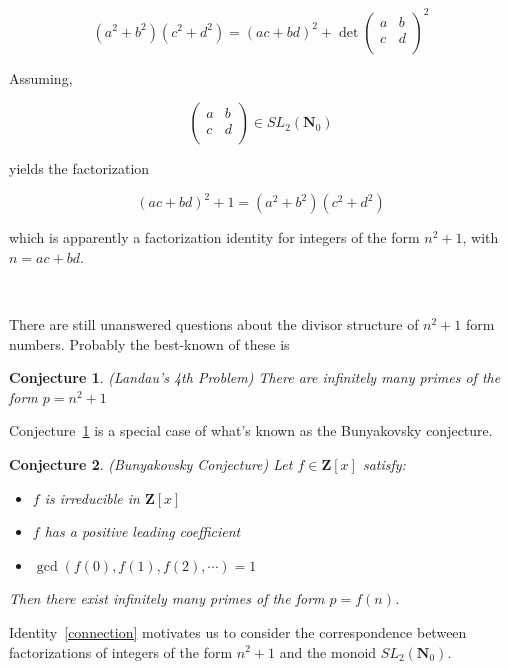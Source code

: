 \documentclass{article}
\newtheorem{conjecture}{Conjecture}
\begin{document}
$$(a^2 + b^2)(c^2 + d^2) = (ac+bd)^2 + \det \begin{pmatrix} a & b \\
c & d \\
\end{pmatrix}^2$$

Assuming, 

$$\begin{pmatrix} 
a & b \\
c & d \\
\end{pmatrix} \in SL_2(\mathbf{N}_0)$$

yields the factorization 

\begin{equation}\label{connection}
 (ac + bd)^2 + 1 = (a^2 + b^2)(c^2 + d^2)   
\end{equation}

which is apparently a factorization identity for integers of the form $n^2+1$, with $n = ac + bd$.

\

There are still unanswered questions about the divisor structure of $n^2 + 1$ form numbers. Probably the best-known of these is

\begin{conjecture}\label{landau} (Landau's 4th Problem)
There are infinitely many primes of the form $p = n^2 + 1$
\end{conjecture}

Conjecture~\ref{landau} is a special case of what's known as the Bunyakovsky conjecture.



\begin{conjecture}\label{bunyakovsky} (Bunyakovsky Conjecture)
Let $f \in \mathbf{Z}[x]$ satisfy:

\begin{itemize}
    \item $f$ is irreducible in $\mathbf{Z}[x]$
    \item $f$ has a positive leading coefficient
    \item $\gcd(f(0), f(1), f(2), \cdots) = 1$
\end{itemize}

Then there exist infinitely many primes of the form $p = f(n)$.
\end{conjecture}


Identity~\ref{connection} motivates us to consider the correspondence between factorizations of integers of the form $n^2 + 1$ and the monoid $SL_2(\mathbf{N}_0)$.
\end{document}
